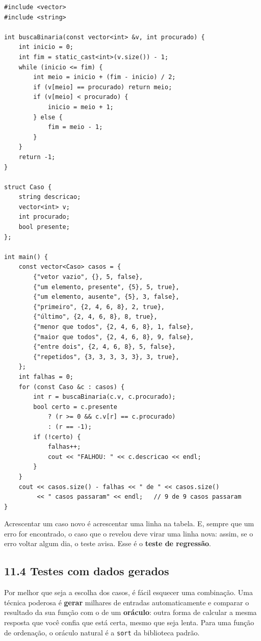 \begin{codigo}
\begin{Verbatim}[breaklines=true, breaksymbolleft={}, fontsize=\footnotesize]
#include <vector>
#include <string>

int buscaBinaria(const vector<int> &v, int procurado) {
    int inicio = 0;
    int fim = static_cast<int>(v.size()) - 1;
    while (inicio <= fim) {
        int meio = inicio + (fim - inicio) / 2;
        if (v[meio] == procurado) return meio;
        if (v[meio] < procurado) {
            inicio = meio + 1;
        } else {
            fim = meio - 1;
        }
    }
    return -1;
}

struct Caso {
    string descricao;
    vector<int> v;
    int procurado;
    bool presente;
};

int main() {
    const vector<Caso> casos = {
        {"vetor vazio", {}, 5, false},
        {"um elemento, presente", {5}, 5, true},
        {"um elemento, ausente", {5}, 3, false},
        {"primeiro", {2, 4, 6, 8}, 2, true},
        {"último", {2, 4, 6, 8}, 8, true},
        {"menor que todos", {2, 4, 6, 8}, 1, false},
        {"maior que todos", {2, 4, 6, 8}, 9, false},
        {"entre dois", {2, 4, 6, 8}, 5, false},
        {"repetidos", {3, 3, 3, 3, 3}, 3, true},
    };
    int falhas = 0;
    for (const Caso &c : casos) {
        int r = buscaBinaria(c.v, c.procurado);
        bool certo = c.presente
            ? (r >= 0 && c.v[r] == c.procurado)
            : (r == -1);
        if (!certo) {
            falhas++;
            cout << "FALHOU: " << c.descricao << endl;
        }
    }
    cout << casos.size() - falhas << " de " << casos.size()
         << " casos passaram" << endl;   // 9 de 9 casos passaram
}
\end{Verbatim}
\end{codigo}

Acrescentar um caso novo é acrescentar uma linha na tabela. E, sempre que um erro for encontrado, o caso que o revelou deve virar uma linha nova: assim, se o erro voltar algum dia, o teste avisa. Esse é o \textbf{teste de regressão}.

\subsection{11.4 Testes com dados gerados}

Por melhor que seja a escolha dos casos, é fácil esquecer uma combinação. Uma técnica poderosa é \textbf{gerar} milhares de entradas automaticamente e comparar o resultado da sua função com o de um \textbf{oráculo}: outra forma de calcular a mesma resposta que você confia que está certa, mesmo que seja lenta. Para uma função de ordenação, o oráculo natural é a \texttt{sort} da biblioteca padrão.

